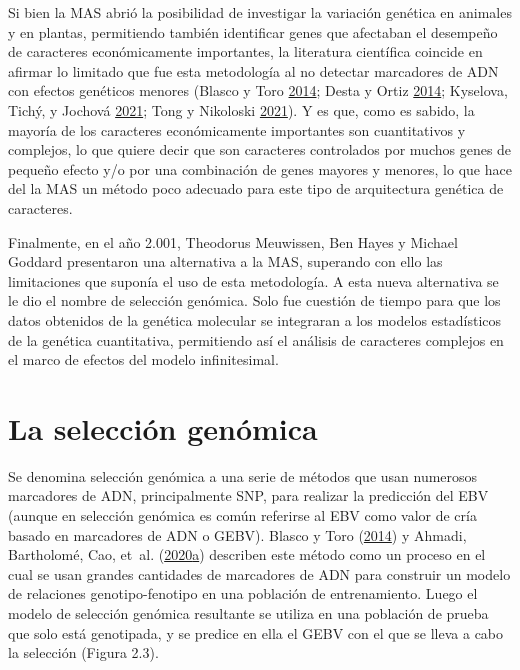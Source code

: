\documentclass[11pt,spanish,a4paper,oneside,]{book} %
\begin{document}
Si bien la MAS abrió la posibilidad de investigar la variación genética en animales y en plantas, permitiendo también identificar genes que afectaban el desempeño de caracteres económicamente importantes, la literatura científica coincide en afirmar lo limitado que fue esta metodología al no detectar marcadores de ADN con efectos genéticos menores (Blasco y Toro \protect\hyperlink{ref-cite:3}{2014}; Desta y Ortiz \protect\hyperlink{ref-cite:10}{2014}; Kyselova, Tichý, y Jochová \protect\hyperlink{ref-cite:32}{2021}; Tong y Nikoloski \protect\hyperlink{ref-cite:7}{2021}). Y es que, como es sabido, la mayoría de los caracteres económicamente importantes son cuantitativos y complejos, lo que quiere decir que son caracteres controlados por muchos genes de pequeño efecto y/o por una combinación de genes mayores y menores, lo que hace del la MAS un método poco adecuado para este tipo de arquitectura genética de caracteres.

Finalmente, en el año 2.001, Theodorus Meuwissen, Ben Hayes y Michael Goddard presentaron una alternativa a la MAS, superando con ello las limitaciones que suponía el uso de esta metodología. A esta nueva alternativa se le dio el nombre de selección genómica. Solo fue cuestión de tiempo para que los datos obtenidos de la genética molecular se integraran a los modelos estadísticos de la genética cuantitativa, permitiendo así el análisis de caracteres complejos en el marco de efectos del modelo infinitesimal.

\hypertarget{la-selecciuxf3n-genuxf3mica}{%
\section{La selección genómica}\label{la-selecciuxf3n-genuxf3mica}}

Se denomina selección genómica a una serie de métodos que usan numerosos marcadores de ADN, principalmente SNP, para realizar la predicción del EBV (aunque en selección genómica es común referirse al EBV como valor de cría basado en marcadores de ADN o GEBV). Blasco y Toro (\protect\hyperlink{ref-cite:3}{2014}) y Ahmadi, Bartholomé, Cao, et~al. (\protect\hyperlink{ref-cite:33}{2020}\protect\hyperlink{ref-cite:33}{a}) describen este método como un proceso en el cual se usan grandes cantidades de marcadores de ADN para construir un modelo de relaciones genotipo-fenotipo en una población de entrenamiento. Luego el modelo de selección genómica resultante se utiliza en una población de prueba que solo está genotipada, y se predice en ella el GEBV con el que se lleva a cabo la selección (Figura 2.3).
\end{document}
